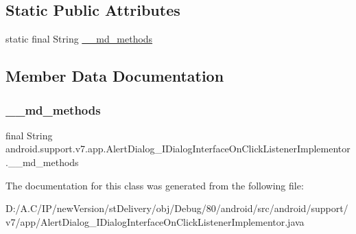 \subsection*{Static Public Attributes}
\begin{DoxyCompactItemize}
\item 
static final String \hyperlink{classandroid_1_1support_1_1v7_1_1app_1_1_alert_dialog___i_dialog_interface_on_click_listener_implementor_a7aee9cb7287752446ffc15a0c438412c}{\+\_\+\+\_\+md\+\_\+methods}
\end{DoxyCompactItemize}


\subsection{Member Data Documentation}
\mbox{\label{classandroid_1_1support_1_1v7_1_1app_1_1_alert_dialog___i_dialog_interface_on_click_listener_implementor_a7aee9cb7287752446ffc15a0c438412c}} 
\subsubsection{\texorpdfstring{\+\_\+\+\_\+md\+\_\+methods}{\_\_md\_methods}}
{\footnotesize\ttfamily final String android.\+support.\+v7.\+app.\+Alert\+Dialog\+\_\+\+I\+Dialog\+Interface\+On\+Click\+Listener\+Implementor.\+\_\+\+\_\+md\+\_\+methods\hspace{0.3cm}{\ttfamily [static]}}



The documentation for this class was generated from the following file\+:\begin{DoxyCompactItemize}
\item 
D\+:/\+A.\+C/\+I\+P/new\+Version/st\+Delivery/obj/\+Debug/80/android/src/android/support/v7/app/Alert\+Dialog\+\_\+\+I\+Dialog\+Interface\+On\+Click\+Listener\+Implementor.\+java\end{DoxyCompactItemize}
